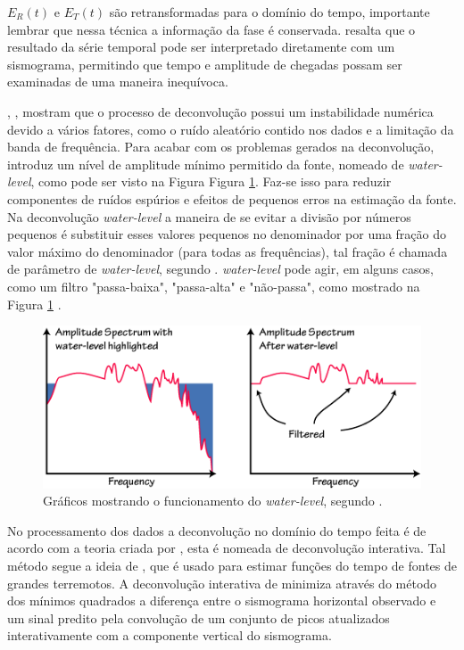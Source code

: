 $E_{R}(t)$ e $E_{T}(t)$ são retransformadas para o domínio do tempo, importante lembrar que nessa técnica a informação da fase é conservada. \cite{langston_structure_1979} resalta que o resultado da série temporal pode ser interpretado diretamente com um sismograma, permitindo que tempo e amplitude de chegadas possam ser examinadas de uma maneira inequívoca.

\cite{clayton_source_1976}, \cite{langston_structure_1979}, \cite{ligorria_iterative_1999} mostram que o processo de deconvolução possui um instabilidade numérica devido a vários fatores, como o ruído aleatório contido nos dados e a limitação da banda de frequência. Para acabar com os problemas gerados na deconvolução, \cite{clayton_source_1976} introduz um nível de amplitude mínimo permitido da fonte, nomeado de \textit{water-level}, como pode ser visto na Figura Figura \ref{water_level}. Faz-se isso para reduzir componentes de ruídos espúrios e efeitos de pequenos erros na estimação da fonte. Na deconvolução \textit{water-level} a maneira de se evitar a divisão por números pequenos é substituir esses valores pequenos no denominador por uma fração do valor máximo do denominador (para todas as frequências), tal fração é chamada de parâmetro de \textit{water-level}, segundo \cite{Ammon_waterlevel_1997}. \textit{water-level} pode agir, em alguns casos, como um filtro "passa-baixa", "passa-alta" e "não-passa", como mostrado na Figura \ref{water_level} .

\begin{figure}[!ht]
\centering
\includegraphics[scale=0.8]{Figs/water_level.png}
\caption{Gráficos mostrando o funcionamento do \textit{water-level}, segundo \cite{Ammon_waterlevel_1997}.}
\label{water_level}
\end{figure}

No processamento dos dados a deconvolução no domínio do tempo feita é de acordo com a teoria criada por \cite{ligorria_iterative_1999}, esta é nomeada de deconvolução interativa. Tal método segue a ideia de \cite{kikuchi_inversion_1982}, que é usado para estimar funções do tempo de fontes de grandes terremotos. A deconvolução interativa de  \cite{ligorria_iterative_1999} minimiza através do método dos mínimos quadrados a diferença entre o sismograma horizontal observado e um sinal predito pela convolução de um conjunto de picos atualizados interativamente com a componente vertical do sismograma.

